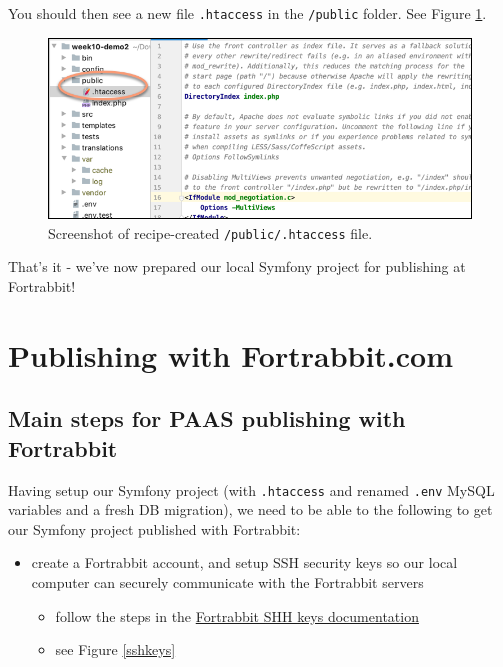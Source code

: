 \documentclass[a4paperpaper,openright]{book}
\begin{document}
You should then see a new file \texttt{.htaccess} in the
\texttt{/public} folder. See Figure \ref{htaccess}.

\begin{figure}
\centering
\includegraphics{./tex2pdf.-05a85d9d563be472/e64fef28d6b71f1e73a309396ae3ee2eb5bc20d6.png}
\caption{Screenshot of recipe-created \texttt{/public/.htaccess}
file.\label{htaccess}}
\end{figure}

That's it - we've now prepared our local Symfony project for publishing
at Fortrabbit!

\hypertarget{publishing-with-fortrabbit.com}{%
\chapter{Publishing with
Fortrabbit.com}\label{publishing-with-fortrabbit.com}}

\hypertarget{main-steps-for-paas-publishing-with-fortrabbit}{%
\section{Main steps for PAAS publishing with
Fortrabbit}\label{main-steps-for-paas-publishing-with-fortrabbit}}

Having setup our Symfony project (with \texttt{.htaccess} and renamed
\texttt{.env} MySQL variables and a fresh DB migration), we need to be
able to the following to get our Symfony project published with
Fortrabbit:

\begin{itemize}
\item
  create a Fortrabbit account, and setup SSH security keys so our local
  computer can securely communicate with the Fortrabbit servers

  \begin{itemize}
  \item
    follow the steps in the
    \href{https://help.fortrabbit.com/ssh-keys}{Fortrabbit SHH keys
    documentation}
  \item
    see Figure \ref{sshkeys}
  \end{itemize}
\end{itemize}
\end{document}
